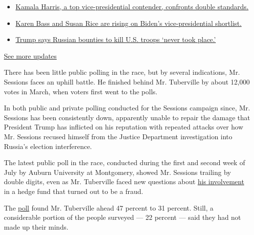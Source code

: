 \begin{itemize}
\tightlist
\item
  \href{https://www.nytimes.com/2020/07/31/us/elections/biden-vs-trump.html?action=click\&pgtype=Article\&state=default\&region=MAIN_CONTENT_1\&context=storylines_live_updates\#link-29fdff45}{Kamala
  Harris, a top vice-presidential contender, confronts double
  standards.}
\item
  \href{https://www.nytimes.com/2020/07/31/us/elections/biden-vs-trump.html?action=click\&pgtype=Article\&state=default\&region=MAIN_CONTENT_1\&context=storylines_live_updates\#link-13ec3d9c}{Karen
  Bass and Susan Rice are rising on Biden's vice-presidential
  shortlist.}
\item
  \href{https://www.nytimes.com/2020/07/31/us/elections/biden-vs-trump.html?action=click\&pgtype=Article\&state=default\&region=MAIN_CONTENT_1\&context=storylines_live_updates\#link-49e9a016}{Trump
  says Russian bounties to kill U.S. troops `never took place.'}
\end{itemize}

\href{https://www.nytimes.com/2020/07/31/us/elections/biden-vs-trump.html?action=click\&pgtype=Article\&state=default\&region=MAIN_CONTENT_1\&context=storylines_live_updates}{See
more updates}

There has been little public polling in the race, but by several
indications, Mr. Sessions faces an uphill battle. He finished behind Mr.
Tuberville by about 12,000 votes in March, when voters first went to the
polls.

In both public and private polling conducted for the Sessions campaign
since, Mr. Sessions has been consistently down, apparently unable to
repair the damage that President Trump has inflicted on his reputation
with repeated attacks over how Mr. Sessions recused himself from the
Justice Department investigation into Russia's election interference.

The latest public poll in the race, conducted during the first and
second week of July by Auburn University at Montgomery, showed Mr.
Sessions trailing by double digits, even as Mr. Tuberville faced new
questions about
\href{https://www.nytimes.com/2020/07/05/us/politics/tommy-tuberville-senate-hedge-fund.html}{his
involvement} in a hedge fund that turned out to be a fraud.

The
\href{http://aum.edu/new-aum-poll-shows-tuberville-leading-sessions-senate-runoff-election}{poll}
found Mr. Tuberville ahead 47 percent to 31 percent. Still, a
considerable portion of the people surveyed --- 22 percent --- said they
had not made up their minds.

